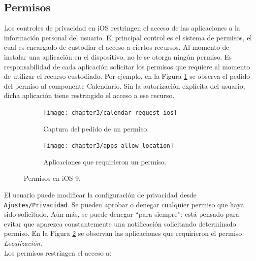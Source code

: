 \subsection{Permisos}
Los controles de privacidad en iOS restringen el acceso de las aplicaciones a la información personal del usuario. El principal control es el sistema de permisos, el cual es encargado de custodiar el acceso a ciertos recursos. Al momento de instalar una aplicación en el dispositivo, no le se otorga ningún permiso. Es responsabilidad de cada aplicación solicitar los permisos que requiere al momento de utilizar el recurso custodiado. Por ejemplo, en la Figura \ref{fig:chapter03:iospermCapture} se observa el pedido del permiso al componente Calendario. Sin la autorización explícita del usuario, dicha aplicación tiene restringido el acceso a ese recurso.\\
\begin{figure}[hbtp]
	\centering
	\begin{subfigure}{.33\linewidth}
    	\texttt{[image: chapter3/calendar\_request\_ios]}
	    \caption{Captura del pedido de un permiso.}    		
	    \label{fig:chapter03:iospermCapture}
    \end{subfigure}
    \begin{subfigure}{.33\linewidth}
    	\texttt{[image: chapter3/apps-allow-location]}
	    \caption{Aplicaciones que requirieron un permiso.}    		
	    \label{fig:chapter03:privacy}
	\end{subfigure}
	\caption{Permisos en iOS 9.}    		
	\label{fig:chapter03:app-permissions-ios}
\end{figure}
\newpage
El usuario puede modificar la configuración de privacidad desde \texttt{Ajustes/Privacidad}. Se pueden aprobar o denegar cualquier permiso que haya sido solicitado. Aún más, se puede denegar ``para siempre'': está pensado para evitar que aparezca constantemente una notificación solicitando determinado permiso. En la Figura \ref{fig:chapter03:privacy} se observan las aplicaciones que requirieron el permiso \emph{Localización}.\\
Los permisos restringen el acceso a:
